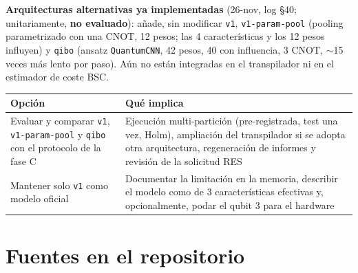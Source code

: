 \documentclass[11pt,a4paper]{article}
\begin{document}
\textbf{Arquitecturas alternativas ya implementadas} (26-nov, log §40;  unitariamente, \textbf{no evaluado}):
 añade, sin modificar \texttt{v1}, \texttt{v1-param-pool} (pooling parametrizado con una
CNOT, 12 pesos; las 4 características y los 12 pesos influyen) y \texttt{qibo} (ansatz \texttt{QuantumCNN}, 42 pesos, 40
con influencia, 3 CNOT, $\sim$15 veces más lento por paso). Aún no están integradas en el transpilador ni en el estimador
de coste BSC.

\begin{table}[H]
\centering\small
\begin{tabularx}{\linewidth}{>{\raggedright\arraybackslash}p{5cm} >{\raggedright\arraybackslash}X}
\toprule
Opción & Qué implica \\
\midrule
Evaluar y comparar \texttt{v1}, \texttt{v1-param-pool} y \texttt{qibo} con el protocolo de la fase C &
  Ejecución multi-partición (pre-registrada, test una vez, Holm), ampliación del transpilador si se adopta otra
  arquitectura, regeneración de informes y revisión de la solicitud RES \\
Mantener solo \texttt{v1} como modelo oficial & Documentar la limitación en la memoria, describir el modelo como de 3
  características efectivas y, opcionalmente, podar el qubit 3 para el hardware \\
\bottomrule
\end{tabularx}
\end{table}

\section{Fuentes en el repositorio}
\end{document}
